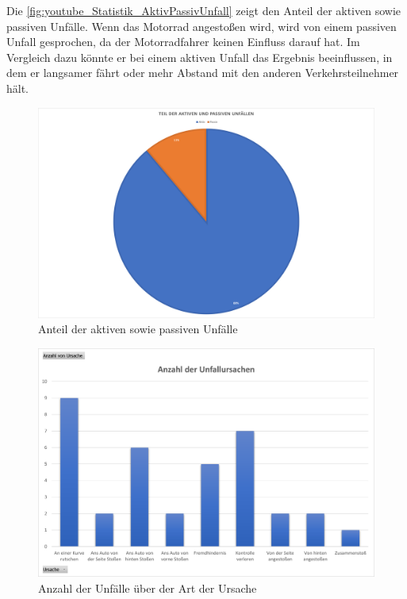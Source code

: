 Die \autoref{fig:youtube_Statistik_AktivPassivUnfall} zeigt den Anteil der aktiven sowie passiven Unfälle. Wenn das Motorrad angestoßen wird, wird von einem passiven Unfall gesprochen, da der Motorradfahrer keinen Einfluss darauf hat. Im Vergleich dazu könnte er bei einem aktiven Unfall das Ergebnis beeinflussen, in dem er langsamer fährt oder mehr Abstand mit den anderen Verkehrsteilnehmer hält.

\begin{figure}[H]
	\centering
	\includegraphics[width=\linewidth]{Bilder/youtube_Statistik_AktivPassivUnfall.png}
	\caption{Anteil der aktiven sowie passiven Unfälle}
	\label{fig:youtube_Statistik_AktivPassivUnfall}
\end{figure}

\begin{figure}[H]
	\centering
	\includegraphics[width=0.9\linewidth]{Bilder/youtube_Statistik_AnzahlUnfallUrsachen.png}
	\caption{Anzahl der Unfälle über der Art der Ursache}
	\label{fig:youtube_Statistik_AnzahlUnfallUrsachen}
\end{figure}


